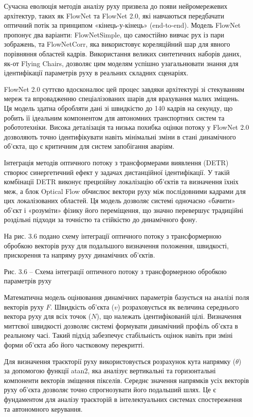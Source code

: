\documentclass[
]{article}
\begin{document}
Сучасна еволюція методів аналізу руху призвела до появи нейромережевих архітектур, таких як FlowNet та FlowNet 2.0, які навчаються передбачати оптичний потік за принципом «кінець-у-кінець» (end-to-end). Модель FlowNet пропонує два варіанти: FlowNetSimple, що самостійно вивчає рух із пари зображень, та FlowNetCorr, яка використовує кореляційний шар для явного порівняння областей кадрів. Використання великих синтетичних наборів даних, як-от Flying Chairs, дозволяє цим моделям успішно узагальнювати знання для ідентифікації параметрів руху в реальних складних сценаріях.

FlowNet 2.0 суттєво вдосконалює цей процес завдяки архітектурі зі стекуванням мереж та впровадженню спеціалізованих шарів для врахування малих зміщень. Ця модель здатна обробляти дані зі швидкістю до 140 кадрів на секунду, що робить її ідеальним компонентом для автономних транспортних систем та робототехніки. Висока деталізація та низька похибка оцінки потоку у FlowNet 2.0 дозволяють точно ідентифікувати навіть мінімальні зміни в стані динамічного об'єкта, що є критичним для систем запобігання аваріям.

Інтеграція методів оптичного потоку з трансформерами виявлення (DETR) створює синергетичний ефект у задачах дистанційної ідентифікації. У такій комбінації DETR виконує прецизійну локалізацію об'єктів та визначення їхніх меж, а блок Optical Flow обчислює вектори руху між послідовними кадрами для цих локалізованих областей. Ця модель дозволяє системі одночасно «бачити» об'єкт і «розуміти» фізику його переміщення, що значно перевершує традиційні роздільні підходи за точністю та стійкістю до динамічного фону.

На рис. 3.6 подано схему інтеграції оптичного потоку з трансформерною обробкою векторів руху для подальшого визначення положення, швидкості, прискорення та напряму руху динамічних об'єктів.

Рис. 3.6 -- Схема інтеграції оптичного потоку з трансформерною обробкою параметрів руху

Математична модель оцінювання динамічних параметрів базується на аналізі поля векторів руху \(F\). Швидкість об'єкта (\(v\)) розраховується як величина середнього вектора руху для всіх точок (\(N\)), що належать ідентифікованій цілі. Визначення миттєвої швидкості дозволяє системі формувати динамічний профіль об'єкта в реальному часі. Такий підхід забезпечує стабільність оцінок навіть при зміні форми об'єкта або його частковому перекритті.

Для визначення траєкторії руху використовується розрахунок кута напрямку (\(\theta\)) за допомогою функції atan2, яка аналізує вертикальні та горизонтальні компоненти векторів зміщення пікселів. Середнє значення напрямків усіх векторів руху об'єкта дозволяє точно спрогнозувати його подальший шлях. Це є фундаментом для аналізу траєкторій в інтелектуальних системах спостереження та автономного керування.
\end{document}
